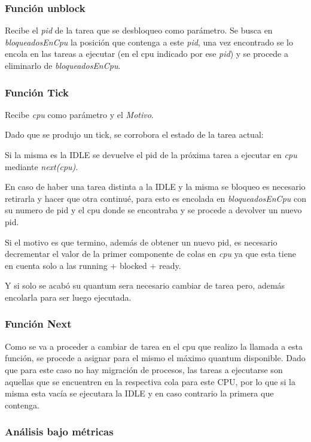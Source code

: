 \documentclass[a4paper]{article}
\begin{document}
\subsubsection*{Funci\'on unblock}	
Recibe el \emph{pid} de la tarea que se desbloqueo como par\'ametro.
Se busca en \emph{bloqueadosEnCpu} la posición que contenga a este \emph{pid}, una vez encontrado se lo encola en las tareas a ejecutar (en el cpu indicado por ese \emph{pid}) y se procede a eliminarlo de \emph{bloqueadosEnCpu}. 


\subsubsection*{Funci\'on Tick}	

Recibe \emph{cpu} como par\'ametro y el \emph{Motivo}. 

Dado que se produjo un tick, se corrobora el estado de la tarea actual:

Si la misma es la IDLE se devuelve el pid de la próxima tarea a ejecutar en \emph{cpu} mediante \emph{next(cpu)}. 

En caso de haber una tarea distinta a la IDLE y la misma se bloqueo es necesario retirarla y hacer que otra continué, para esto es encolada en \emph{bloqueadosEnCpu} con su numero de pid y el cpu donde se encontraba y se procede a devolver un nuevo pid.
 
Si el motivo es que termino, además de obtener un nuevo pid, es necesario decrementar el valor de la primer componente de colas en \emph{cpu} ya que esta tiene en cuenta solo a las running + blocked + ready. 

Y si solo se acab\'o su quantum sera necesario cambiar de tarea pero, además encolarla para ser luego ejecutada.

\subsubsection*{Funci\'on Next}	
	

Como se va a proceder a cambiar de tarea en el cpu que realizo la llamada a esta función, se procede a asignar para el mismo el máximo quantum disponible. 
Dado que para este caso no hay migración de procesos, las tareas a ejecutarse son aquellas que se encuentren en la respectiva cola para este CPU, por lo que si la misma esta vacía se ejecutara la IDLE y en caso contrario la primera que contenga.

\bigskip 
 
\subsubsection{An\'alisis bajo m\'etricas} 
 
\end{document}
